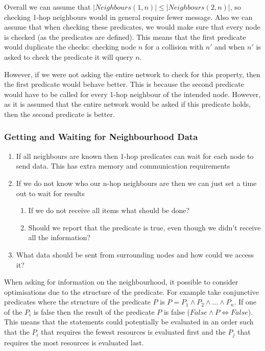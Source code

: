 Overall we can assume that $|Neighbours(1, n)| \leq |Neighbours(2, n)|$, so checking 1-hop neighbours would in general require fewer message. Also we can assume that when checking these predicates, we would make sure that every node is checked (as the predicates are defined). This means that the first predicate would duplicate the checks: checking node $n$ for a collision with $n'$ and when $n'$ is asked to check the predicate it will query $n$.

However, if we were not asking the entire network to check for this property, then the first predicate would behave better. This is because the second predicate would have to be called for every 1-hop neighbour of the intended node. However, as it is assumed that the entire network would be asked if this predicate holds, then the second predicate is better.


\subsubsection{Getting and Waiting for Neighbourhood Data}

\begin{enumerate}
	\item If all neighbours are known then 1-hop predicates can wait for each node to send data. This has extra memory and communication requirements
	\item If we do not know who our n-hop neighbours are then we can just set a time out to wait for results
	\begin{enumerate}
		\item If we do not receive all items what should be done?
		\item Should we report that the predicate is true, even though we didn't receive all the information?
	\end{enumerate}
	\item What data should be sent from surrounding nodes and how could we access it?
\end{enumerate}


When asking for information on the neighbourhood, it possible to consider optimisations due to the structure of the predicate. For example take conjunctive predicates where the structure of the predicate $P$ is $P = P_1 \land P_2 \land \ldots \land P_n$. If one of the $P_i$ is false then the result of the predicate $P$ is false ($False \land P \Leftrightarrow False$). This means that the statements could potentially be evaluated in an order such that the $P_i$ that requires the fewest resources is evaluated first and the $P_j$ that requires the most resources is evaluated last.

